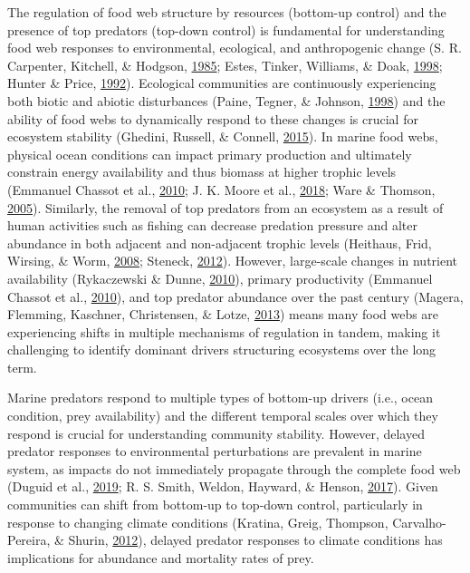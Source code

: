 \documentclass [11pt, proquest] {uwthesis}[2015/03/03]
\begin{document}
The regulation of food web structure by resources (bottom-up control)
and the presence of top predators (top-down control) is fundamental for
understanding food web responses to environmental, ecological, and
anthropogenic change (S. R. Carpenter, Kitchell, \& Hodgson,
\protect\hyperlink{ref-Carpenter1985}{1985}; Estes, Tinker, Williams, \&
Doak, \protect\hyperlink{ref-Estes1998}{1998}; Hunter \& Price,
\protect\hyperlink{ref-Hunter1992}{1992}). Ecological communities are
continuously experiencing both biotic and abiotic disturbances (Paine,
Tegner, \& Johnson, \protect\hyperlink{ref-Paine1998}{1998}) and the
ability of food webs to dynamically respond to these changes is crucial
for ecosystem stability (Ghedini, Russell, \& Connell,
\protect\hyperlink{ref-Ghedini2015}{2015}). In marine food webs,
physical ocean conditions can impact primary production and ultimately
constrain energy availability and thus biomass at higher trophic levels
(Emmanuel Chassot et al., \protect\hyperlink{ref-Chassot2010}{2010}; J.
K. Moore et al., \protect\hyperlink{ref-Moore2018}{2018}; Ware \&
Thomson, \protect\hyperlink{ref-Ware2005}{2005}). Similarly, the removal
of top predators from an ecosystem as a result of human activities such
as fishing can decrease predation pressure and alter abundance in both
adjacent and non-adjacent trophic levels (Heithaus, Frid, Wirsing, \&
Worm, \protect\hyperlink{ref-Heithaus2008}{2008}; Steneck,
\protect\hyperlink{ref-Steneck2012}{2012}). However, large-scale changes
in nutrient availability (Rykaczewski \& Dunne,
\protect\hyperlink{ref-Rykaczewski2010}{2010}), primary productivity
(Emmanuel Chassot et al., \protect\hyperlink{ref-Chassot2010}{2010}),
and top predator abundance over the past century (Magera, Flemming,
Kaschner, Christensen, \& Lotze,
\protect\hyperlink{ref-Magera2013}{2013}) means many food webs are
experiencing shifts in multiple mechanisms of regulation in tandem,
making it challenging to identify dominant drivers structuring
ecosystems over the long term.

Marine predators respond to multiple types of bottom-up drivers (i.e.,
ocean condition, prey availability) and the different temporal scales
over which they respond is crucial for understanding community
stability. However, delayed predator responses to environmental
perturbations are prevalent in marine system, as impacts do not
immediately propagate through the complete food web (Duguid et al.,
\protect\hyperlink{ref-Duguid2019}{2019}; R. S. Smith, Weldon, Hayward,
\& Henson, \protect\hyperlink{ref-Smith2017}{2017}). Given communities
can shift from bottom-up to top-down control, particularly in response
to changing climate conditions (Kratina, Greig, Thompson,
Carvalho-Pereira, \& Shurin, \protect\hyperlink{ref-Kratina2012}{2012}),
delayed predator responses to climate conditions has implications for
abundance and mortality rates of prey.
\end{document}
